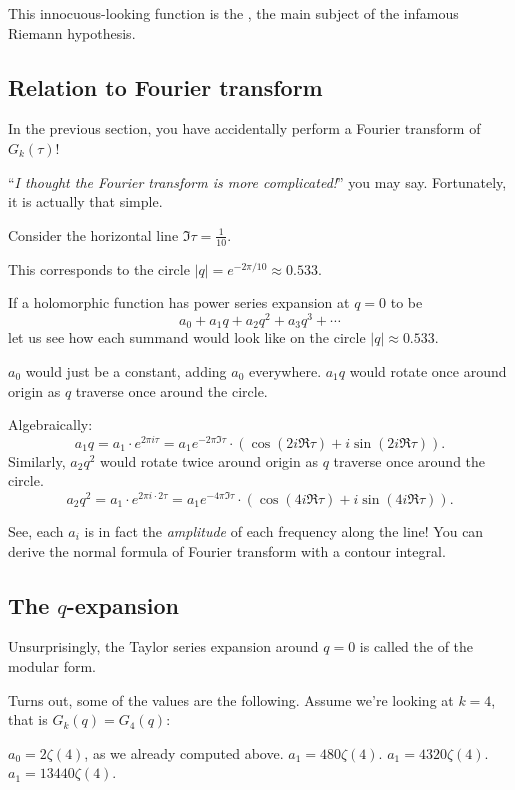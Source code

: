 \begin{remark}
	This innocuous-looking function is the , the main subject of the
	infamous Riemann hypothesis.
\end{remark}

\subsection{Relation to Fourier transform}

In the previous section, you have accidentally perform a Fourier transform of $G_k(\tau)$!

``\emph{I thought the Fourier transform is more complicated!}'' you may say.
Fortunately, it is actually that simple.

Consider the horizontal line $\Im \tau = \frac{1}{10}$.

This corresponds to the circle $|q| = e^{-2 \pi/10} \approx 0.533$.


If a holomorphic function has power series expansion at $q=0$ to be
\[ a_0+a_1 q+a_2 q^2+a_3 q^3+\cdots \]
let us see how each summand would look like on the circle $|q|\approx 0.533$.
\begin{itemize}
	\ii $a_0$ would just be a constant, adding $a_0$ everywhere.
	\ii $a_1 q$ would rotate once around origin as $q$ traverse once around the circle.

	Algebraically:
	\[ a_1 q = a_1 \cdot e^{2 \pi i \tau}
	= a_1 e^{-2 \pi \Im\tau} \cdot (\cos (2i \Re \tau) + i \sin (2i \Re \tau)).  \]
	\ii Similarly, $a_2 q^2$ would rotate twice around origin as $q$ traverse once around the
	circle.
	\[ a_2 q^2 = a_1 \cdot e^{2 \pi i \cdot 2 \tau}
	= a_1 e^{-4 \pi \Im\tau} \cdot (\cos (4i \Re \tau) + i \sin (4i \Re \tau)).  \]
\end{itemize}
See, each $a_i$ is in fact the \emph{amplitude} of each frequency along the line!
You can derive the normal formula of Fourier transform with a contour integral.

\subsection{The $q$-expansion}

Unsurprisingly, the Taylor series expansion around $q=0$ is called the  of the
modular form.

Turns out, some of the values are the following. Assume we're looking at $k=4$, that is $G_k(q) =
G_4(q)$:
\begin{itemize}
	\ii $a_0 = 2 \zeta(4)$, as we already computed above.
	\ii $a_1 = 480 \zeta(4)$.
	\ii $a_1 = 4320 \zeta(4)$.
	\ii $a_1 = 13440 \zeta(4)$.
\end{itemize}

